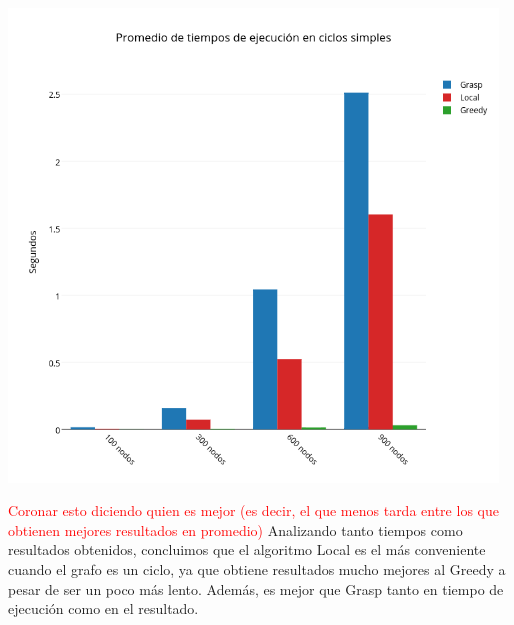 \begin{center}
 	\includegraphics[width=13cm, keepaspectratio=yes]{imagenes/coliseo/Cicle.png}
\end{center}

\textcolor{red}{Coronar esto diciendo quien es mejor (es decir, el que menos tarda entre los que obtienen mejores resultados en promedio)}
Analizando tanto tiempos como resultados obtenidos, concluimos que el algoritmo Local es el m\'as conveniente cuando el grafo es un ciclo, ya que obtiene resultados mucho mejores al Greedy a pesar
de ser un poco m\'as lento. Adem\'as, es mejor que Grasp tanto en tiempo de ejecuci\'on como en el resultado.
